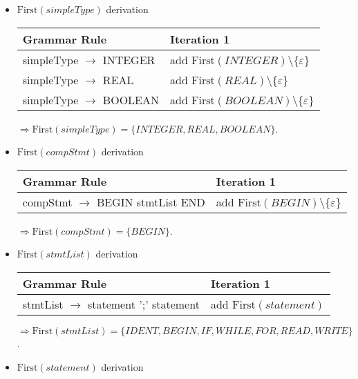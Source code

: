 \documentclass[8pt]{scrartcl}
\newcommand{\First}[1]{\mathrm{First}(#1)}
\newcommand{\epsset}{\{\varepsilon\}}
\begin{document}
\begin{itemize}
            \item $\First{simpleType}$ derivation\newline
                \begin{tabular}{|l |l |}
                    \hline
                    \textbf{Grammar Rule} & \textbf{Iteration 1}\\
                    \hline
                    simpleType $\rightarrow$ INTEGER & add $\First{INTEGER} \setminus \epsset$\\
                    \hline
                    simpleType $\rightarrow$ REAL & add $\First{REAL} \setminus \epsset$\\
                    \hline
                    simpleType $\rightarrow$ BOOLEAN & add $\First{BOOLEAN} \setminus \epsset$\\
                    \hline
                \end{tabular}\newline
                $\Rightarrow \First{simpleType} = \{INTEGER, REAL, BOOLEAN\}$.
            \item $\First{compStmt}$ derivation\newline
                \begin{tabular}{|l |l |}
                    \hline
                    \textbf{Grammar Rule} & \textbf{Iteration 1}\\
                    \hline
                    compStmt $\rightarrow$ BEGIN stmtList END & add $\First{BEGIN} \setminus \epsset$\\
                    \hline
                \end{tabular}\newline
                $\Rightarrow \First{compStmt} = \{BEGIN\}$.
            \item $\First{stmtList}$ derivation\newline
                \begin{tabular}{|l |l |}
                    \hline
                    \textbf{Grammar Rule} & \textbf{Iteration 1}\\
                    \hline
                    stmtList $\rightarrow$ statement { ';' statement } & add $\First{statement}$\\
                    \hline
                \end{tabular}\newline
                $\Rightarrow \First{stmtList} = \{IDENT, BEGIN, IF, WHILE, FOR, READ, WRITE\}$.
            \item $\First{statement}$ derivation\newline

\end{itemize}
\end{document}
